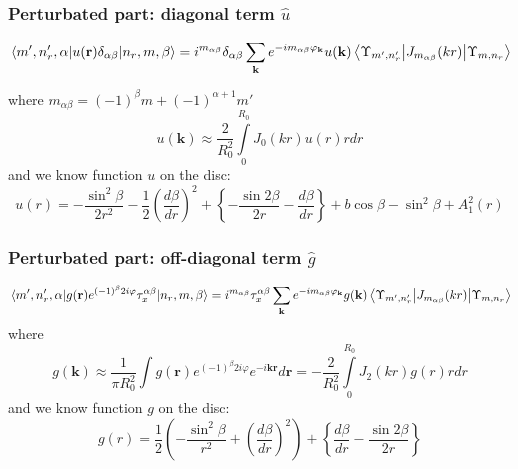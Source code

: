 \documentclass[a4paper,article,14pt]{extarticle}
\begin{document}
\subsubsection{Perturbated part: diagonal term $\hat u$}
\begin{equation}
\mel{m', n'_r,\alpha} {u(\mathbf{r})  \delta_{\alpha \beta}}{n_r,m, \beta} = i^{m_{\alpha \beta} }  \delta_{\alpha \beta} \sum\limits_{\mathbf{k} }      e^{- i m_{\alpha \beta} \varphi_{\mathbf{k}}} u(\mathbf{k})\mel{\Upsilon_{m', n'_r}} {J_{m_{\alpha \beta}} (kr) }{\Upsilon_{m, n_r}}
\end{equation}

\noindent where $ m_{\alpha \beta} = (-1)^{\beta}m + (-1)^{\alpha+1} m' $
\begin{equation}
u (\mathbf{k}) \approx \frac{2}{R_0^2}  \int\limits_{0}^{R_0}  J_0 (k r ) u(r) r dr 
\end{equation} 
and we know function $u$ on the disc:
\begin{equation}
u(r) = -\frac{\sin^2 \beta }{2r^2} - \frac{1}{2}\left( \frac{d\beta }{dr} \right)^2 +  \left\{  - \frac{\sin 2\beta }{2r}  - \frac{d\beta }{dr} \right\} + b\cos \beta - \sin ^ 2 \beta + A^2_1(r)
\end{equation}

\subsubsection{Perturbated part: off-diagonal term $\hat g$}

\begin{equation}
\mel{m', n'_r, \alpha} {g(\mathbf{r})   e^{ (-1)^{\beta} 2  i   \varphi} \tau^{\alpha \beta}_x} {n_r,m,\beta} =i^{m_{\alpha \beta}} \tau^{\alpha \beta}_x \sum\limits_{\mathbf{k} }      e^{-i m_{\alpha \beta} \varphi_{\mathbf{k}}}  g(\mathbf{k})\mel{\Upsilon_{m', n'_r}} {J_{m_{\alpha \beta}} (kr) }{\Upsilon_{m, n_r}}
\end{equation}
\noindent where 
\begin{equation}
g (\mathbf{k}) \approx \frac{1}{\pi R_0^2}  \int  g(\mathbf{r})   e^{ (-1)^{\beta} 2  i   \varphi} e^{-i \mathbf{k} \mathbf{r}}  d\mathbf{r} = - \frac{2}{R_0^2}  \int\limits_{0}^{R_0}  J_2 (k r ) g(r) r dr 
\end{equation} 
and we know function $g$ on the disc:
\begin{equation}
g(r) = \frac{1}{2}\left(  - \frac{\sin ^2\beta }{r^2} + \left( \frac{d\beta }{dr} \right)^2 \right) 
+ \left\{ \frac{d\beta }{dr} - \frac{\sin 2\beta }{2r} \right\}
\end{equation}
\end{document}
